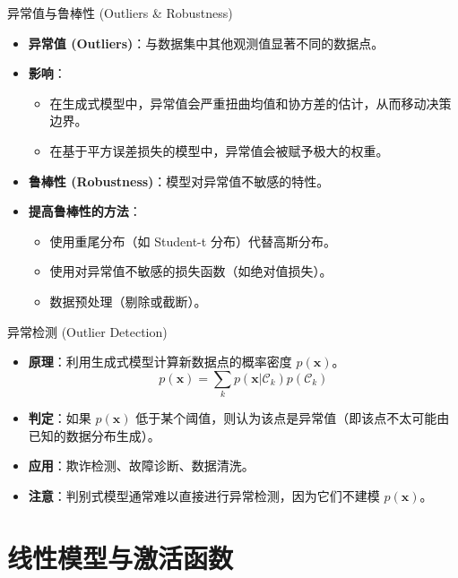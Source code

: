 \documentclass[12pt, aspectratio=169]{beamer}
\newcommand{\vect}[1]{\mathbf{#1}}
\begin{document}
\begin{frame}{异常值与鲁棒性 (Outliers \& Robustness)}
    \begin{itemize}
        \item \textbf{异常值 (Outliers)}：与数据集中其他观测值显著不同的数据点。
        \item \textbf{影响}：
        \begin{itemize}
            \item 在生成式模型中，异常值会严重扭曲均值和协方差的估计，从而移动决策边界。
            \item 在基于平方误差损失的模型中，异常值会被赋予极大的权重。
        \end{itemize}
        \item \textbf{鲁棒性 (Robustness)}：模型对异常值不敏感的特性。
        \item \textbf{提高鲁棒性的方法}：
        \begin{itemize}
            \item 使用重尾分布（如 Student-t 分布）代替高斯分布。
            \item 使用对异常值不敏感的损失函数（如绝对值损失）。
            \item 数据预处理（剔除或截断）。
        \end{itemize}
    \end{itemize}
\end{frame}

\begin{frame}{异常检测 (Outlier Detection)}
    \begin{itemize}
        \item \textbf{原理}：利用生成式模型计算新数据点的概率密度 $p(\vect{x})$。
        $$ p(\vect{x}) = \sum_k p(\vect{x}|\mathcal{C}_k)p(\mathcal{C}_k) $$
        \item \textbf{判定}：如果 $p(\vect{x})$ 低于某个阈值，则认为该点是异常值（即该点不太可能由已知的数据分布生成）。
        \item \textbf{应用}：欺诈检测、故障诊断、数据清洗。
        \item \textbf{注意}：判别式模型通常难以直接进行异常检测，因为它们不建模 $p(\vect{x})$。
    \end{itemize}
\end{frame}

\section{线性模型与激活函数}
\end{document}
